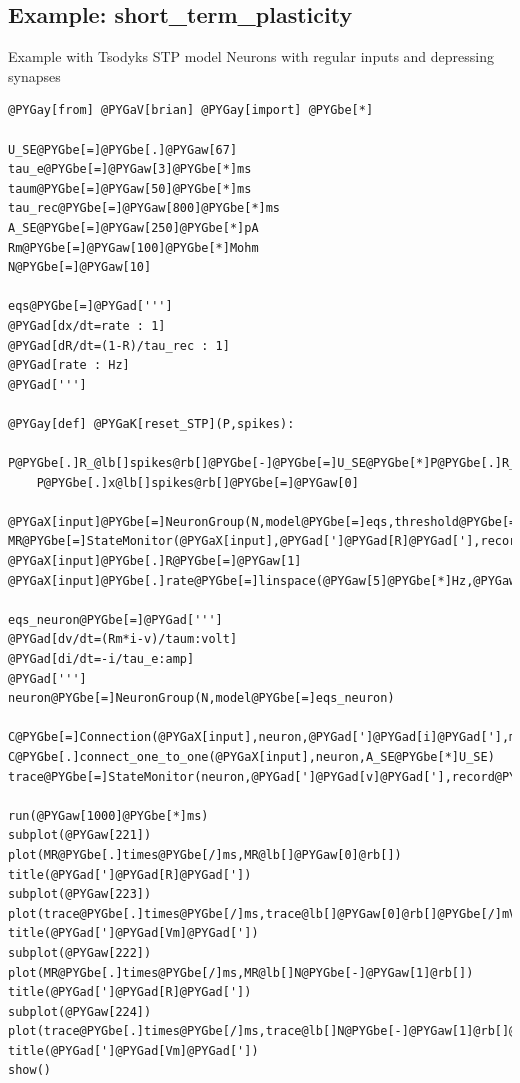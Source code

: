 \documentclass[letterpaper,10pt]{manual}
\begin{document}
\resetcurrentobjects
{}

\hypertarget{index-52}{}\subsection{Example: short\_term\_plasticity}

Example with Tsodyks STP model
Neurons with regular inputs and depressing synapses

\begin{Verbatim}[commandchars=@\[\]]
@PYGay[from] @PYGaV[brian] @PYGay[import] @PYGbe[*]

U_SE@PYGbe[=]@PYGbe[.]@PYGaw[67]
tau_e@PYGbe[=]@PYGaw[3]@PYGbe[*]ms
taum@PYGbe[=]@PYGaw[50]@PYGbe[*]ms
tau_rec@PYGbe[=]@PYGaw[800]@PYGbe[*]ms
A_SE@PYGbe[=]@PYGaw[250]@PYGbe[*]pA
Rm@PYGbe[=]@PYGaw[100]@PYGbe[*]Mohm
N@PYGbe[=]@PYGaw[10]

eqs@PYGbe[=]@PYGad[''']
@PYGad[dx/dt=rate : 1]
@PYGad[dR/dt=(1-R)/tau_rec : 1]
@PYGad[rate : Hz]
@PYGad[''']

@PYGay[def] @PYGaK[reset_STP](P,spikes):
    P@PYGbe[.]R_@lb[]spikes@rb[]@PYGbe[-]@PYGbe[=]U_SE@PYGbe[*]P@PYGbe[.]R_@lb[]spikes@rb[]
    P@PYGbe[.]x@lb[]spikes@rb[]@PYGbe[=]@PYGaw[0]

@PYGaX[input]@PYGbe[=]NeuronGroup(N,model@PYGbe[=]eqs,threshold@PYGbe[=]@PYGaw[1.],reset@PYGbe[=]reset_STP)
MR@PYGbe[=]StateMonitor(@PYGaX[input],@PYGad[']@PYGad[R]@PYGad['],record@PYGbe[=]@lb[]@PYGaw[0],N@PYGbe[-]@PYGaw[1]@rb[])
@PYGaX[input]@PYGbe[.]R@PYGbe[=]@PYGaw[1]
@PYGaX[input]@PYGbe[.]rate@PYGbe[=]linspace(@PYGaw[5]@PYGbe[*]Hz,@PYGaw[30]@PYGbe[*]Hz,N)

eqs_neuron@PYGbe[=]@PYGad[''']
@PYGad[dv/dt=(Rm*i-v)/taum:volt]
@PYGad[di/dt=-i/tau_e:amp]
@PYGad[''']
neuron@PYGbe[=]NeuronGroup(N,model@PYGbe[=]eqs_neuron)

C@PYGbe[=]Connection(@PYGaX[input],neuron,@PYGad[']@PYGad[i]@PYGad['],modulation@PYGbe[=]@PYGad[']@PYGad[R]@PYGad['])
C@PYGbe[.]connect_one_to_one(@PYGaX[input],neuron,A_SE@PYGbe[*]U_SE)
trace@PYGbe[=]StateMonitor(neuron,@PYGad[']@PYGad[v]@PYGad['],record@PYGbe[=]@lb[]@PYGaw[0],N@PYGbe[-]@PYGaw[1]@rb[])

run(@PYGaw[1000]@PYGbe[*]ms)
subplot(@PYGaw[221])
plot(MR@PYGbe[.]times@PYGbe[/]ms,MR@lb[]@PYGaw[0]@rb[])
title(@PYGad[']@PYGad[R]@PYGad['])
subplot(@PYGaw[223])
plot(trace@PYGbe[.]times@PYGbe[/]ms,trace@lb[]@PYGaw[0]@rb[]@PYGbe[/]mV)
title(@PYGad[']@PYGad[Vm]@PYGad['])
subplot(@PYGaw[222])
plot(MR@PYGbe[.]times@PYGbe[/]ms,MR@lb[]N@PYGbe[-]@PYGaw[1]@rb[])
title(@PYGad[']@PYGad[R]@PYGad['])
subplot(@PYGaw[224])
plot(trace@PYGbe[.]times@PYGbe[/]ms,trace@lb[]N@PYGbe[-]@PYGaw[1]@rb[]@PYGbe[/]mV)
title(@PYGad[']@PYGad[Vm]@PYGad['])
show()
\end{Verbatim}
\end{document}

